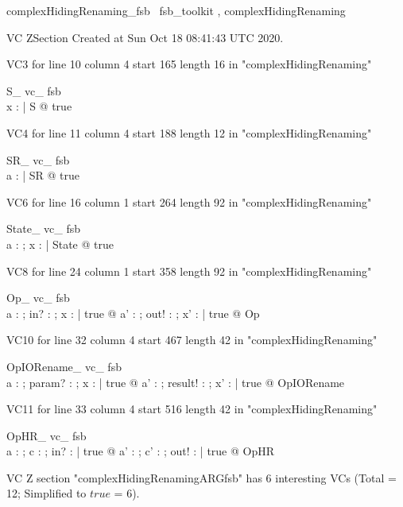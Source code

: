 \documentclass{article}
\begin{document}

\begin{zsection}	 \SECTION complexHidingRenaming\_fsb \parents~fsb\_toolkit , complexHidingRenaming
\end{zsection}

VC ZSection Created at Sun Oct 18 08:41:43 UTC 2020.

VC3 for line 10 column 4 start 165 length 16 in "complexHidingRenaming"
\begin{theorem}{ S\_ vc\_ fsb}\\
 \exists x : \nat | S @ true \\

\end{theorem}

VC4 for line 11 column 4 start 188 length 12 in "complexHidingRenaming"
\begin{theorem}{ SR\_ vc\_ fsb}\\
 \exists a : \nat | SR @ true \\

\end{theorem}

VC6 for line 16 column 1 start 264 length 92 in "complexHidingRenaming"
\begin{theorem}{ State\_ vc\_ fsb}\\
 \exists a : \nat ; x : \nat | State @ true \\

\end{theorem}

VC8 for line 24 column 1 start 358 length 92 in "complexHidingRenaming"
\begin{theorem}{ Op\_ vc\_ fsb}\\
 \forall a : \nat ; in? : \nat ; x : \nat | true @ \exists a' : \nat ; out! : \nat ; x' : \nat | true @ Op \\

\end{theorem}

VC10 for line 32 column 4 start 467 length 42 in "complexHidingRenaming"
\begin{theorem}{ OpIORename\_ vc\_ fsb}\\
 \forall a : \nat ; param? : \nat ; x : \nat | true @ \exists a' : \nat ; result! : \nat ; x' : \nat | true @ OpIORename \\

\end{theorem}

VC11 for line 33 column 4 start 516 length 42 in "complexHidingRenaming"
\begin{theorem}{ OpHR\_ vc\_ fsb}\\
 \forall a : \nat ; c : \nat ; in? : \nat | true @ \exists a' : \nat ; c' : \nat ; out! : \nat | true @ OpHR \\

\end{theorem}



 VC Z section "complexHidingRenamingARGfsb" has $6$ interesting VCs (Total = 12; Simplified to $true$ = 6).



\end{document}
